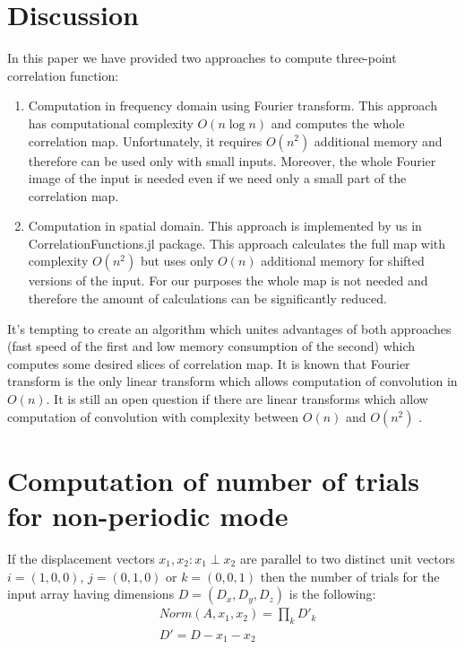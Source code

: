 \documentclass[1p]{elsarticle}
\begin{document}
\section{Discussion}
In this paper we have provided two approaches to compute three-point correlation
function:
\begin{enumerate}
\item Computation in frequency domain using Fourier transform. This approach has
  computational complexity $O(n \log n)$ and computes the whole correlation
  map. Unfortunately, it requires $O(n^2)$ additional memory and therefore can
  be used only with small inputs. Moreover, the whole Fourier image of the input
  is needed even if we need only a small part of the correlation map.
\item Computation in spatial domain. This approach is implemented by us in
  CorrelationFunctions.jl package. This approach calculates the full map with
  complexity $O(n^2)$ but uses only $O(n)$ additional memory for shifted
  versions of the input. For our purposes the whole map is not needed and
  therefore the amount of calculations can be significantly reduced.
\end{enumerate}
It's tempting to create an algorithm which unites advantages of both approaches
(fast speed of the first and low memory consumption of the second) which
computes some desired slices of correlation map. It is known that Fourier
transform is the only linear transform which allows computation of convolution
in $O(n)$. It is still an open question if there are linear transforms which
allow computation of convolution with complexity between $O(n)$ and $O(n^2)$
\cite{stone2008uniqueness,stone1998convolution}.

\appendix
\section{Computation of number of trials for non-periodic mode}
\label{sec:number-of-trials}
If the displacement vectors $x_1, x_2: x_1 \perp x_2$ are parallel to two
distinct unit vectors $i=(1,0,0)$, $j=(0,1,0)$ or $k=(0,0,1)$ then the number of
trials for the input array having dimensions $D = (D_x, D_y, D_z)$ is the
following:
\begin{equation}
  \begin{aligned}
    & Norm(A, x_1, x_2) = \prod_k D'_k \\
    & D' = D - x_1 - x_2
  \end{aligned}
\end{equation}
\end{document}

